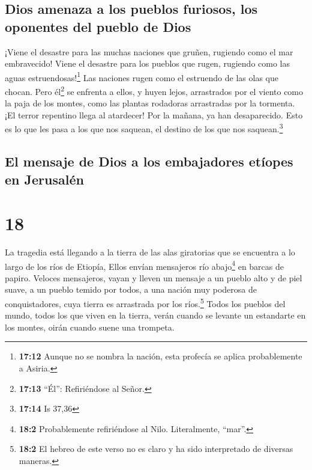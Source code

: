 \hypertarget{dios-amenaza-a-los-pueblos-furiosos-los-oponentes-del-pueblo-de-dios}{%
\subsection{Dios amenaza a los pueblos furiosos, los oponentes del
pueblo de
Dios}\label{dios-amenaza-a-los-pueblos-furiosos-los-oponentes-del-pueblo-de-dios}}

 ¡Viene el desastre para las muchas naciones que gruñen,
rugiendo como el mar embravecido! Viene el desastre para los pueblos que
rugen, rugiendo como las aguas estruendosas!\footnote{\textbf{17:12}
  Aunque no se nombra la nación, esta profecía se aplica probablemente a
  Asiria.}  Las naciones rugen como el estruendo de las
olas que chocan. Pero él\footnote{\textbf{17:13} ``Él'': Refiriéndose al
  Señor.} se enfrenta a ellos, y huyen lejos, arrastrados por el viento
como la paja de los montes, como las plantas rodadoras arrastradas por
la tormenta.  ¡El terror repentino llega al atardecer!
Por la mañana, ya han desaparecido. Esto es lo que les pasa a los que
nos saquean, el destino de los que nos saquean.\footnote{\textbf{17:14}
  Is 37,36}

\hypertarget{el-mensaje-de-dios-a-los-embajadores-etuxedopes-en-jerusaluxe9n}{%
\subsection{El mensaje de Dios a los embajadores etíopes en
Jerusalén}\label{el-mensaje-de-dios-a-los-embajadores-etuxedopes-en-jerusaluxe9n}}

\hypertarget{section-17}{%
\section{18}\label{section-17}}

 La tragedia está llegando a la tierra de las alas
giratorias que se encuentra a lo largo de los ríos de Etiopía,
 Ellos envían mensajeros río abajo\footnote{\textbf{18:2}
  Probablemente refiriéndose al Nilo. Literalmente, ``mar''.} en barcas
de papiro. Veloces mensajeros, vayan y lleven un mensaje a un pueblo
alto y de piel suave, a un pueblo temido por todos, a una nación muy
poderosa de conquistadores, cuya tierra es arrastrada por los
ríos.\footnote{\textbf{18:2} El hebreo de este verso no es claro y ha
  sido interpretado de diversas maneras.}  Todos los
pueblos del mundo, todos los que viven en la tierra, verán cuando se
levante un estandarte en los montes, oirán cuando suene una trompeta.

